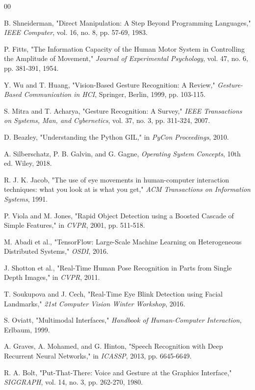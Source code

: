 \documentclass[conference]{IEEEtran}
\begin{document}
\begin{thebibliography}{00}

 B. Shneiderman, "Direct Manipulation: A Step Beyond Programming Languages," \textit{IEEE Computer}, vol. 16, no. 8, pp. 57-69, 1983.

 P. Fitts, "The Information Capacity of the Human Motor System in Controlling the Amplitude of Movement," \textit{Journal of Experimental Psychology}, vol. 47, no. 6, pp. 381-391, 1954.

 Y. Wu and T. Huang, "Vision-Based Gesture Recognition: A Review," \textit{Gesture-Based Communication in HCI}, Springer, Berlin, 1999, pp. 103-115.

 S. Mitra and T. Acharya, "Gesture Recognition: A Survey," \textit{IEEE Transactions on Systems, Man, and Cybernetics}, vol. 37, no. 3, pp. 311-324, 2007.

 D. Beazley, "Understanding the Python GIL," in \textit{PyCon Proceedings}, 2010.

 A. Silberschatz, P. B. Galvin, and G. Gagne, \textit{Operating System Concepts}, 10th ed. Wiley, 2018.

 R. J. K. Jacob, "The use of eye movements in human-computer interaction techniques: what you look at is what you get," \textit{ACM Transactions on Information Systems}, 1991.

 P. Viola and M. Jones, "Rapid Object Detection using a Boosted Cascade of Simple Features," in \textit{CVPR}, 2001, pp. 511-518.

 M. Abadi et al., "TensorFlow: Large-Scale Machine Learning on Heterogeneous Distributed Systems," \textit{OSDI}, 2016.

 J. Shotton et al., "Real-Time Human Pose Recognition in Parts from Single Depth Images," in \textit{CVPR}, 2011.

 T. Soukupova and J. Cech, "Real-Time Eye Blink Detection using Facial Landmarks," \textit{21st Computer Vision Winter Workshop}, 2016.

 S. Oviatt, "Multimodal Interfaces," \textit{Handbook of Human-Computer Interaction}, Erlbaum, 1999.

 A. Graves, A. Mohamed, and G. Hinton, "Speech Recognition with Deep Recurrent Neural Networks," in \textit{ICASSP}, 2013, pp. 6645-6649.

 R. A. Bolt, "Put-That-There: Voice and Gesture at the Graphics Interface," \textit{SIGGRAPH}, vol. 14, no. 3, pp. 262-270, 1980.


\end{thebibliography}
\end{document}
